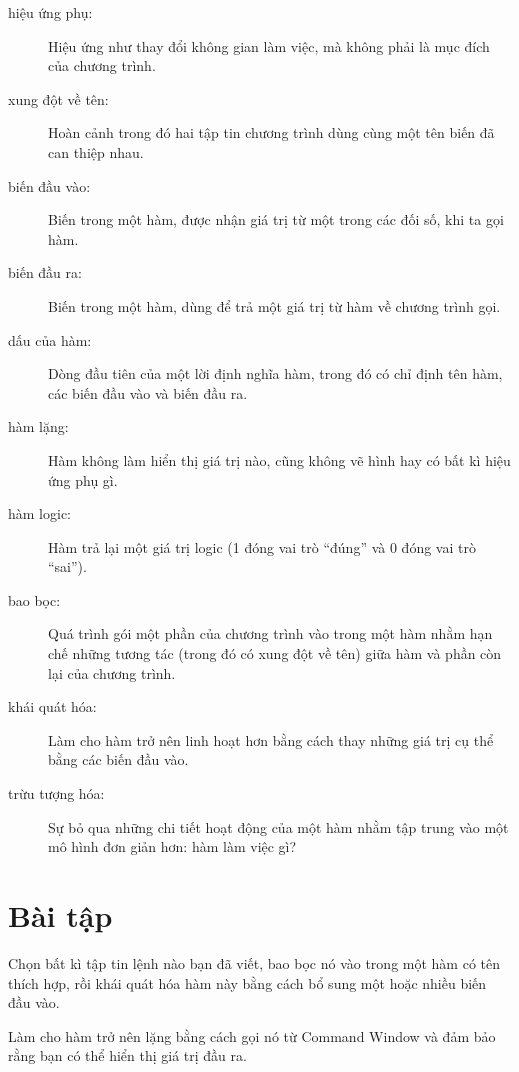 \documentclass[12pt]{book}
\begin{document}
\begin{description}

\item[hiệu ứng phụ:] Hiệu ứng như thay đổi không gian làm việc,
mà không phải là mục đích của chương trình.

\item[xung đột về tên:] Hoàn cảnh trong đó hai tập tin chương trình
dùng cùng một tên biến đã can thiệp nhau.

\item[biến đầu vào:] Biến trong một hàm, được nhận giá trị 
từ một trong các đối số, khi ta gọi hàm.

\item[biến đầu ra:] Biến trong một hàm, dùng để trả một giá trị
từ hàm về chương trình gọi.

\item[dấu của hàm:] Dòng đầu tiên của một lời định nghĩa hàm,
trong đó có chỉ định tên hàm, các biến đầu vào và biến đầu ra.

\item[hàm lặng:] Hàm không làm hiển thị giá trị nào, cũng không
vẽ hình hay có bất kì hiệu ứng phụ gì.

\item[hàm logic:] Hàm trả lại một giá trị logic (1 đóng vai trò ``đúng''
và 0 đóng vai trò ``sai'').

\item[bao bọc:] Quá trình gói một phần của chương trình vào trong
một hàm nhằm hạn chế những tương tác (trong đó có xung đột về tên)
giữa hàm và phần còn lại của chương trình.

\item[khái quát hóa:] Làm cho hàm trở nên linh hoạt hơn bằng cách
thay những giá trị cụ thể bằng các biến đầu vào.

\item[trừu tượng hóa:] Sự bỏ qua những chi tiết hoạt động của một hàm
nhằm tập trung vào một mô hình đơn giản hơn: hàm làm việc gì?


\end{description}

\section{Bài tập}

\begin{ex}
Chọn bất kì tập tin lệnh nào bạn đã viết, bao bọc nó vào trong
một hàm có tên thích hợp, rồi khái quát hóa hàm này bằng cách
bổ sung một hoặc nhiều biến đầu vào.

Làm cho hàm trở nên lặng bằng cách gọi nó từ Command
Window và đảm bảo rằng bạn có thể hiển thị giá trị đầu ra.
\end{ex}
\end{document}
